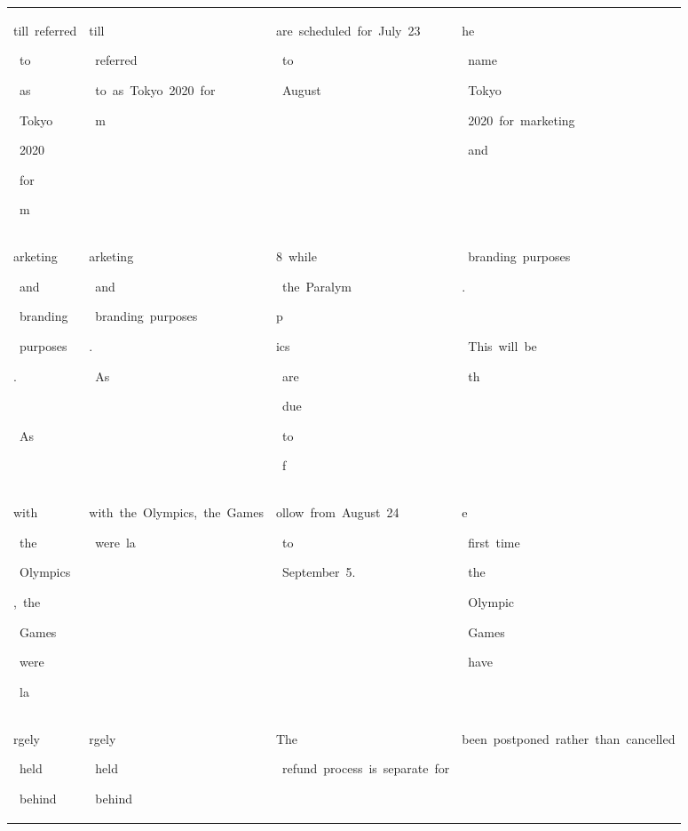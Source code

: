 \begin{table}[h]
\begin{tabular}{ l l l l }
 \colorbox{cm_63!40}{\strut till\ referred}\colorbox{cm_31!40}{\strut \ to}\colorbox{cm_34!40}{\strut \ as}\colorbox{cm_4!40}{\strut \ Tokyo}\colorbox{cm_34!40}{\strut \ 2020}\colorbox{cm_29!40}{\strut \ for}\colorbox{cm_63!40}{\strut \ m} & \colorbox{cm_12!40}{\strut till}\colorbox{cm_0!40}{\strut \ referred}\colorbox{cm_12!40}{\strut \ to\ as\ Tokyo\ 2020\ for}\colorbox{cm_0!40}{\strut \ m} & \colorbox{cm_0!40}{\strut are\ scheduled\ for\ July\ 23}\colorbox{cm_12!40}{\strut \ to}\colorbox{cm_0!40}{\strut \ August\ } & \colorbox{cm_12!40}{\strut he}\colorbox{cm_0!40}{\strut \ name}\colorbox{cm_12!40}{\strut \ Tokyo}\colorbox{cm_0!40}{\strut \ 2020\ for\ marketing}\colorbox{cm_12!40}{\strut \ and} \\ 
 \colorbox{cm_63!40}{\strut arketing}\colorbox{cm_0!40}{\strut \ and}\colorbox{cm_29!40}{\strut \ branding}\colorbox{cm_31!40}{\strut \ purposes}\colorbox{cm_32!40}{\strut .}\colorbox{cm_51!40}{\strut \ }\colorbox{cm_13!40}{\strut \ As}\colorbox{cm_25!40}{\strut \ } & \colorbox{cm_0!40}{\strut arketing}\colorbox{cm_12!40}{\strut \ and}\colorbox{cm_0!40}{\strut \ branding\ purposes}\colorbox{cm_12!40}{\strut .\ }\colorbox{cm_0!40}{\strut \ As}\colorbox{cm_12!40}{\strut \ } & \colorbox{cm_0!40}{\strut 8\ while}\colorbox{cm_12!40}{\strut \ the\ Paralym}\colorbox{cm_25!40}{\strut p}\colorbox{cm_38!40}{\strut ics}\colorbox{cm_0!40}{\strut \ are}\colorbox{cm_12!40}{\strut \ due}\colorbox{cm_25!40}{\strut \ to}\colorbox{cm_0!40}{\strut \ f} & \colorbox{cm_0!40}{\strut \ branding\ purposes}\colorbox{cm_12!40}{\strut .}\colorbox{cm_25!40}{\strut \ }\colorbox{cm_0!40}{\strut \ This\ will\ be}\colorbox{cm_12!40}{\strut \ th} \\ 
 \colorbox{cm_25!40}{\strut with}\colorbox{cm_29!40}{\strut \ the}\colorbox{cm_45!40}{\strut \ Olympics}\colorbox{cm_32!40}{\strut ,\ the}\colorbox{cm_0!40}{\strut \ Games}\colorbox{cm_22!40}{\strut \ were}\colorbox{cm_56!40}{\strut \ la} & \colorbox{cm_12!40}{\strut with\ the\ Olympics,\ the\ Games}\colorbox{cm_0!40}{\strut \ were\ la} & \colorbox{cm_0!40}{\strut ollow\ from\ August\ 24}\colorbox{cm_12!40}{\strut \ to}\colorbox{cm_0!40}{\strut \ September\ 5.} & \colorbox{cm_12!40}{\strut e}\colorbox{cm_0!40}{\strut \ first\ time}\colorbox{cm_12!40}{\strut \ the}\colorbox{cm_0!40}{\strut \ Olympic}\colorbox{cm_12!40}{\strut \ Games}\colorbox{cm_0!40}{\strut \ have\ } \\ 
 \colorbox{cm_56!40}{\strut rgely}\colorbox{cm_20!40}{\strut \ held}\colorbox{cm_24!40}{\strut \ behind} & \colorbox{cm_0!40}{\strut rgely}\colorbox{cm_12!40}{\strut \ held}\colorbox{cm_0!40}{\strut \ behind} & \colorbox{cm_12!40}{\strut }\colorbox{cm_25!40}{\strut }\colorbox{cm_38!40}{\strut The}\colorbox{cm_0!40}{\strut \ refund\ process\ is\ separate\ for} & \colorbox{cm_0!40}{\strut been\ postponed\ rather\ than\ cancelled} \\ 

\end{tabular}
\end{table}
